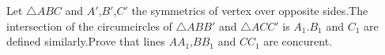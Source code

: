 Let $\triangle ABC$ and $A'$,$B'$,$C'$ the symmetrics of vertex over opposite sides.The intersection of the  circumcircles of $\triangle ABB'$ and $\triangle ACC'$ is $A_1$.$B_1$ and $C_1$ are defined similarly.Prove that lines $AA_1$,$BB_1$ and $CC_1$ are concurent.